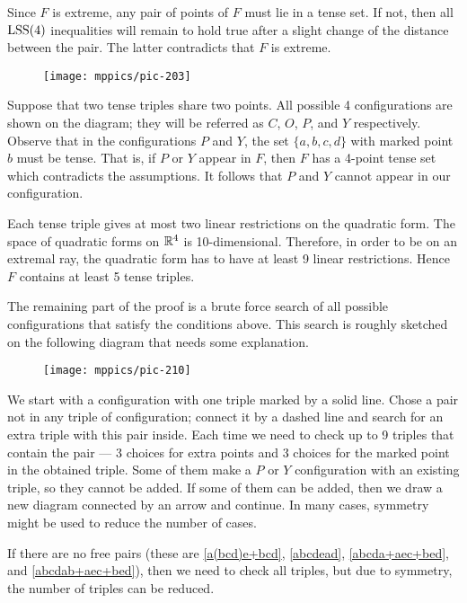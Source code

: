 \documentclass{article}
\begin{document}
Since $F$ is extreme, any pair of points of $F$ must lie in a tense set.
If not, then all $\mathrm{LSS}(4)$ inequalities will remain to hold true after a slight change of the distance between the pair.
The latter contradicts that $F$ is extreme.

\begin{wrapfigure}{l}{60mm}
\vskip-0mm
\centering
\texttt{[image: mppics/pic-203]}
\label{page:COPY}
\end{wrapfigure}

Suppose that two tense triples share two points.
All possible 4 configurations are shown on the diagram; they will be referred as $C$, $O$, $P$, and $Y$ respectively.
Observe that in the configurations $P$ and $Y$, the set $\{a,b,c,d\}$ with marked point $b$ must be tense.
That is, if $P$ or $Y$ appear in $F$, then $F$ has a 4-point tense set which contradicts the assumptions.
It follows that $P$ and $Y$ cannot appear in our configuration.

Each tense triple gives at most two linear restrictions on the quadratic form.
The space of quadratic forms on $\mathbb{R}^4$ is 10-dimensional.
Therefore, in order to be on an extremal ray, the quadratic form has to have at least 9 linear restrictions.
Hence $F$ contains at least 5 tense triples.

The remaining part of the proof is a brute force search of all possible configurations that satisfy the conditions above.
This search is roughly sketched on the following diagram that needs some explanation.
\begin{figure}[ht!]
\centering
\texttt{[image: mppics/pic-210]}
\end{figure}
We start with a configuration with one triple marked by a solid line.
Chose a pair not in any triple of configuration;
connect it by a dashed line and search for an extra triple with this pair inside.
Each time we need to check up to 9 triples that contain the pair --- 3 choices for extra points and 3 choices for the marked point in the obtained triple.
Some of them make a $P$ or $Y$ configuration with an existing triple, so they cannot be added.
If some of them can be added, then we draw a new diagram connected by an arrow and continue.
In many cases, symmetry might be used to reduce the number of cases.
 

If there are no free pairs (these are \ref{a(bcd)e+bcd}, \ref{abcdead}, \ref{abcda+aec+bed}, and \ref{abcdab+aec+bed}),
then we need to check all triples,
but due to symmetry, the number of triples can be reduced.
\end{document}
